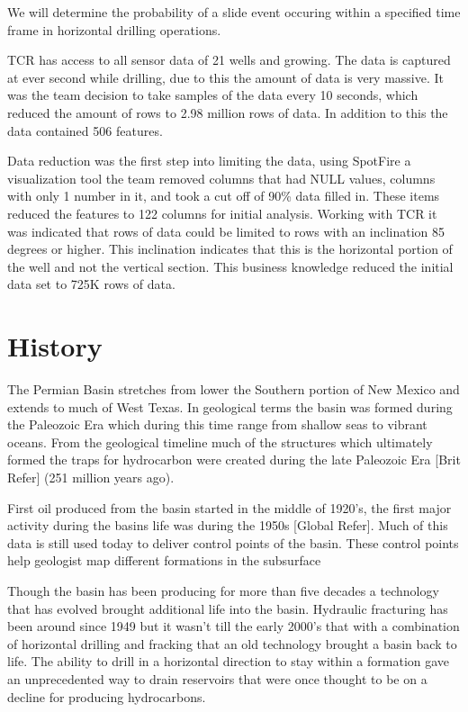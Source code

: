 \documentclass{llncs}
\begin{document}
We will determine the probability of a slide event occuring within a specified time frame in horizontal drilling operations.  

TCR has access to all sensor data of 21 wells and growing. The data is captured at ever second while drilling, due to this the amount of data is very massive. It was the team decision to take samples of the data every 10 seconds, which reduced the amount of rows to 2.98 million rows of data. In addition to this the data contained 506 features.

Data reduction was the first step into limiting the data, using SpotFire a visualization tool the team removed columns that had NULL values, columns with only 1 number in it, and took a cut off of 90\% data filled in. These items reduced the features to 122 columns for initial analysis. Working with TCR it was indicated that rows of data could be limited to rows with an inclination 85 degrees or higher. This inclination indicates that this is the horizontal portion of the well and not the vertical section. This business knowledge reduced the initial data set to 725K rows of data.

\section{History}
The Permian Basin stretches from lower the Southern portion of New Mexico and extends to much of West Texas. In geological terms the basin was formed during the Paleozoic Era which during this time range from shallow seas to vibrant oceans. From the geological timeline much of the structures which ultimately formed the traps for hydrocarbon were created during the late Paleozoic Era [Brit Refer] (251 million years ago).

First oil produced from the basin started in the middle of 1920’s, the first major activity during the basins life was during the 1950s [Global Refer]. Much of this data is still used today to deliver control points of the basin. These control points help geologist map different formations in the subsurface

Though the basin has been producing for more than five decades a technology that has evolved brought additional life into the basin. Hydraulic fracturing has been around since 1949 but it wasn’t till the early 2000’s that with a combination of horizontal drilling and fracking that an old technology brought a basin back to life. The ability to drill in a horizontal direction to stay within a formation gave an unprecedented way to drain reservoirs that were once thought to be on a decline for producing hydrocarbons.
\end{document}

